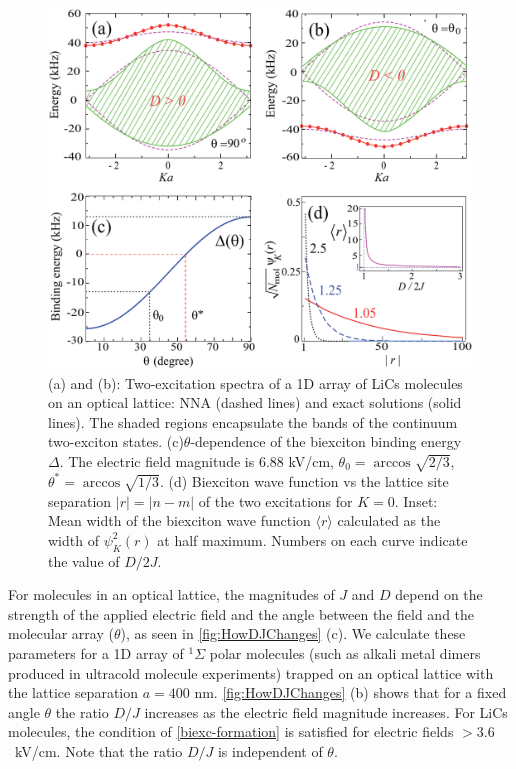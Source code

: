 \begin{figure}[htbp]
\centering
\includegraphics[width=\linewidth]{FigureBiexciton.pdf}
\caption{(a) and (b): Two-excitation spectra of a 1D array of LiCs molecules on an optical lattice: NNA
(dashed lines) and exact solutions (solid lines). The shaded regions encapsulate the bands of the continuum 
two-exciton states. (c)$\theta$-dependence of the biexciton binding energy $\Delta$. The electric field magnitude is
 6.88 kV/cm, $\theta_0 = \arccos \sqrt{2/3}$, $\theta^\ast = \arccos \sqrt{1/3}$. (d) Biexciton wave function vs the
 lattice site separation $|r|=|n-m|$ of the two excitations for $K=0$. Inset: Mean width of the biexciton wave function
 $\langle r \rangle$ calculated as the width of $\psi^{2}_{K}(r)$ at half maximum. Numbers on each curve indicate the
 value of $D/2J$.}
\label{fig:biexcitonSpectrum}
\end{figure}


For molecules in an optical lattice, the magnitudes of $J$ and $D$ depend on the strength of the applied electric field
 and the angle between the field and the molecular array  ($\theta$), as seen in \autoref{fig:HowDJChanges} (c).  We
 calculate these parameters for a 1D array of $^1\Sigma$ polar molecules (such as alkali metal dimers produced in
 ultracold molecule experiments) trapped on an optical lattice with the lattice separation $a = 400$ nm.
 \autoref{fig:HowDJChanges} (b)
 shows that for a fixed angle $\theta$ the ratio $D/J$ increases as the electric field magnitude increases. 
For LiCs molecules, the condition of \autoref{biexc-formation} is satisfied for electric fields $>3.6$~kV/cm. Note that the
 ratio $D/J$ is independent of $\theta$. 

